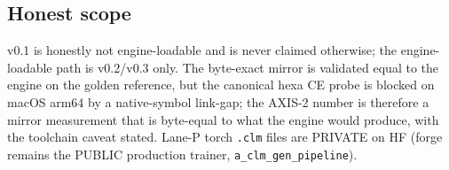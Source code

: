 \subsection{Honest scope}
\label{app:clm-scope}

v0.1 is honestly not engine-loadable and is never claimed otherwise; the
engine-loadable path is v0.2/v0.3 only. The byte-exact mirror is validated equal
to the engine on the golden reference, but the canonical hexa CE probe is blocked
on macOS arm64 by a native-symbol link-gap; the AXIS-2 number is therefore a
mirror measurement that is byte-equal to what the engine would produce, with the
toolchain caveat stated. Lane-P torch \texttt{.clm} files are PRIVATE on HF
(forge remains the PUBLIC production trainer, \texttt{a\_clm\_gen\_pipeline}).
